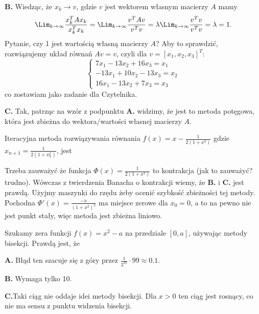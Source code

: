 \begin{solutions}
    \textbf{B.} Wiedząc, że $x_k\to v$, gdzie $v$ jest wektorem własnym macierzy $A$ mamy
    $$
    \Lim_{k\to\infty}\frac{x_{k}^T A x_{k}}{x_{k}^T x_{k}} = \Lim_{k\to\infty}\frac{v^T A v}{v^T v} = \lambda\Lim_{k\to\infty}\frac{v^T v}{v^T v} = \lambda = 1.
    $$
    Pytanie, czy 1 jest wartością własną macierzy $A$? Aby to sprawdzić, rozwiązujemy układ równań $Av=v$, czyli dla $v=[x_1,x_2,x_3]^T$:
    $$
    \begin{cases}
        7x_1 - 13x_2 + 16x_3 = x_1 \\
        -13x_1 + 10x_2 - 13x_3 = x_2 \\
        16x_1 - 13x_2 + 7x_3 = x_3
    \end{cases}
    $$
    co zostawiam jako zadanie dla Czytelnika.

    \textbf{C.} Tak, patrząc na wzór z podpunktu \textbf{A.} widzimy, że jest to metoda potęgowa, która jest zbieżna do wektora/wartości własnej macierzy $A$.

    \sol Iteracyjna metoda rozwiązywania równania $f(x) = x - \frac{1}{2(1+x^2)}$ gdzie $x_{n+1} = \frac{1}{2(1+x_n^2)}$, jest
    
    Trzeba zauważyć że funkcja $\Phi(x) = \frac{1}{2(1+x^2)}$ to kontrakcja (jak to zauważyć? ~ trudno). Wówczas z twierdzenia Banacha o kontrakcji wiemy, że \textbf{B.} i \textbf{C.} jest prawdą. Użyjmy maszynki do rzędu żeby ocenić szybkość zbieżności tej metody. Pochodna $\Phi'(x) = \frac{-x}{(1+x^2)^2}$ ma miejsce zerowe dla $x_0 = 0$, a to na pewno nie jest punkt stały, więc metoda jest zbieżna liniowo.

    \sol Szukamy zera funkcji $f(x) = x^2 - a$ na przedziale $[0, a]$, używając metody bisekcji. Prawdą jest, że
    
    \textbf{A.} Błąd ten szacuje się z góry przez $\frac{1}{2^{10}}\cdot99 \approx 0.1$.

    \textbf{B.} Wymaga tylko 10.

    \textbf{C.}Taki ciąg nie oddaje idei metody bisekcji. Dla $x>0$ ten ciąg jest rosnący, co nie ma sensu z punktu widzenia bisekcji.


\end{solutions}

